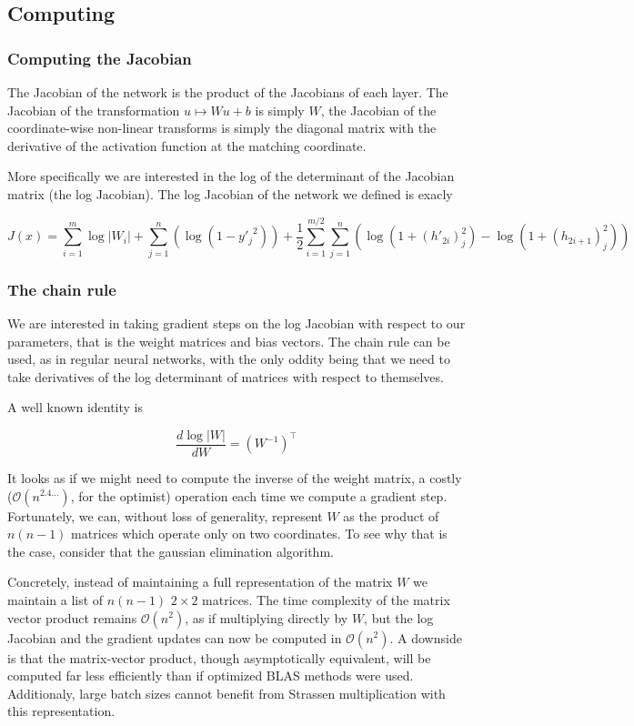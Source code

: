 \documentclass{article}
\begin{document}
\subsection{Computing}

\subsubsection{Computing the Jacobian}
The Jacobian  of the network is the product of the Jacobians of each
layer. The Jacobian of the transformation \( u \mapsto W u + b \) is simply
\( W \), the Jacobian of the coordinate-wise non-linear transforms is simply
the diagonal matrix with the derivative of the activation function at the
matching coordinate.

More specifically we are interested in the log of the determinant of the
Jacobian matrix (the log Jacobian). The log Jacobian of the network we defined
is exacly

\[
  J(x) = \sum_{i=1}^{m} \log |W_{i}| +
  \sum_{j=1}^n \left(\log(1-{y'_j}^2)\right)
  + \frac{1}{2} \sum_{i=1}^{m / 2} \sum_{j=1}^n
  \left( \log (1 + (h'_{2i})_j^2) - \log (1 + (h_{2i+1})_j^2) \right)
\]

\subsubsection{The chain rule}
We are interested in taking gradient steps on the log Jacobian with respect to
our parameters, that is the weight matrices and bias vectors. The chain rule
can be used, as in regular neural networks, with the only oddity being that we
need to take derivatives of the log determinant of matrices with respect to
themselves.

A well known identity is

\[
  \frac{d \log |W|}{d W} = (W^{-1})^\top
\]

It looks as if we might need to compute the inverse of the weight matrix, a
costly (\(\mathcal{O}(n^{2.4\ldots})\), for the optimist) operation each time we
compute a gradient step. Fortunately, we can, without loss of generality,
represent \(W\) as the product of \(n(n-1)\) matrices which operate only on two
coordinates. To see why that is the case, consider that the gaussian elimination
algorithm.

Concretely, instead of maintaining a full representation of the matrix \(W\) we
maintain a list of \(n(n-1)\) \(2 \times 2\) matrices. The time complexity of
the matrix vector product remains \(\mathcal{O}(n^2)\), as if multiplying
directly by \(W\), but the log Jacobian and the gradient updates can now be
computed in \(\mathcal{O}(n^2)\). A downside is that the matrix-vector product,
though asymptotically equivalent, will be computed far less efficiently
than if optimized BLAS methods were used. Additionaly, large batch sizes
cannot benefit from Strassen multiplication with this representation.
\end{document}
